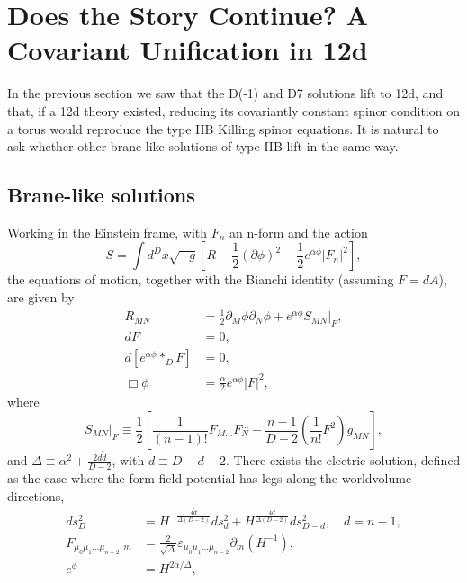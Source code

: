 \section{Does the Story Continue? A Covariant Unification in 12d}
\label{sec:covariant-unification}

In the previous section we saw that the D(-1) and D7 solutions lift to 12d, and that, if a 12d theory existed, reducing its covariantly constant spinor condition on a torus would reproduce the type IIB Killing spinor equations.
It is natural to ask whether other brane-like solutions of type IIB lift in the same way.


\subsection{Brane-like solutions}
\label{sec:general brane solns}
Working in the Einstein frame, with $F_n$ an n-form and the action
\begin{equation}
S = \int d^Dx\sqrt{-g}\left[
    R - \frac{1}{2}(\partial\phi)^2 - \frac{1}{2}e^{\alpha\phi}|F_n|^2
\right],
\end{equation}
the equations of motion, together with the Bianchi identity (assuming $F = dA$), are given by \cite{Stelle:1998xg}
\begin{equation}
\begin{aligned}
R_{MN}
&= \frac{1}{2}\partial_M\phi\partial_N\phi + e^{\alpha\phi}S_{MN}\big|_F,\\
dF&=0,\\
d[e^{\alpha\phi}*_D F] &=0,\\
\Box\phi&=\frac{\alpha}{2}e^{\alpha\phi}|F|^2,
\end{aligned}
\end{equation}
where
\begin{equation}
S_{MN}\big|_{F}\equiv
\frac{1}{2}\left[
    \frac{1}{(n-1)!}F_{M...}F_N^{...}
    -\frac{n-1}{D-2}\left(\frac{1}{n!}F^2\right)g_{MN}
\right],
\end{equation}
and $\Delta\equiv \alpha^2 +\frac{2 d \tilde{d}}{D-2}$, with $\tilde{d} \equiv D-d-2$.
There exists the electric solution, defined as the case where the form-field potential has legs along the worldvolume directions,
\begin{equation}
\begin{aligned}
ds_D^2
&=H^{-\frac{4\tilde d}{\Delta(D-2)}}ds_{d}^2+
H^{\frac{4d}{\Delta(D-2)}}ds_{D-d}^2,\quad
d = n-1,\\
F_{\mu_0\mu_1...\mu_{n-2},m}
&=\frac{2}{\sqrt\Delta}\varepsilon_{\mu_0\mu_1...\mu_{n-2}}\partial_m (H^{-1}),\\
e^\phi
&=H^{2\alpha/\Delta},
\end{aligned}
\end{equation}
